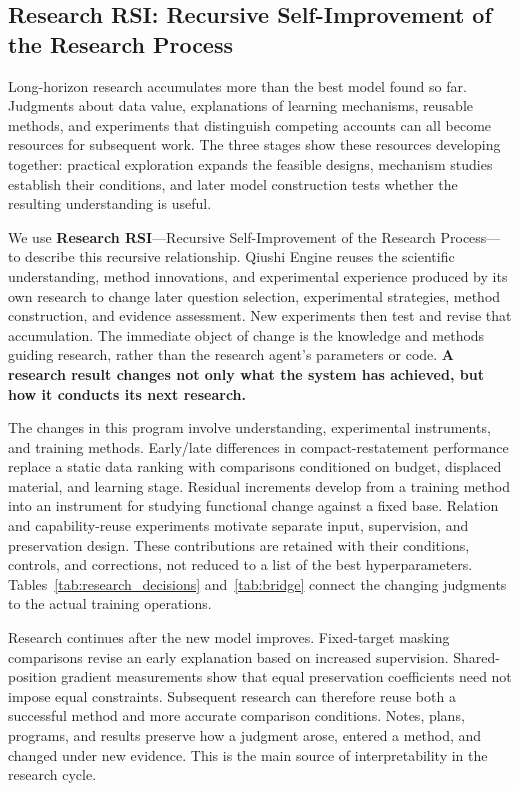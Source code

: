 \subsection{Research RSI: Recursive Self-Improvement of the Research Process}
\label{sec:rsi}

Long-horizon research accumulates more than the best model found so far. Judgments about data value, explanations of learning mechanisms, reusable methods, and experiments that distinguish competing accounts can all become resources for subsequent work. The three stages show these resources developing together: practical exploration expands the feasible designs, mechanism studies establish their conditions, and later model construction tests whether the resulting understanding is useful.

We use \textbf{Research RSI}---Recursive Self-Improvement of the Research Process---to describe this recursive relationship. Qiushi Engine reuses the scientific understanding, method innovations, and experimental experience produced by its own research to change later question selection, experimental strategies, method construction, and evidence assessment. New experiments then test and revise that accumulation. The immediate object of change is the knowledge and methods guiding research, rather than the research agent's parameters or code. \textbf{A research result changes not only what the system has achieved, but how it conducts its next research.}

The changes in this program involve understanding, experimental instruments, and training methods. Early/late differences in compact-restatement performance replace a static data ranking with comparisons conditioned on budget, displaced material, and learning stage. Residual increments develop from a training method into an instrument for studying functional change against a fixed base. Relation and capability-reuse experiments motivate separate input, supervision, and preservation design. These contributions are retained with their conditions, controls, and corrections, not reduced to a list of the best hyperparameters. Tables~\ref{tab:research_decisions} and~\ref{tab:bridge} connect the changing judgments to the actual training operations.

Research continues after the new model improves. Fixed-target masking comparisons revise an early explanation based on increased supervision. Shared-position gradient measurements show that equal preservation coefficients need not impose equal constraints. Subsequent research can therefore reuse both a successful method and more accurate comparison conditions. Notes, plans, programs, and results preserve how a judgment arose, entered a method, and changed under new evidence. This is the main source of interpretability in the research cycle.

